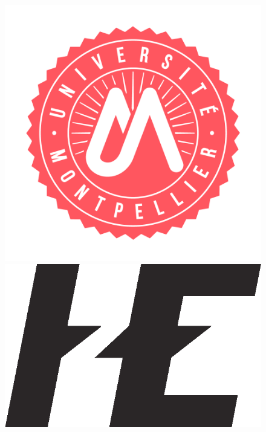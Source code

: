 \documentclass[oneside,11pt,a4paper]{article}
\begin{document}
\begin{titlepage}
	\begin{figure}[h]
		\begin{minipage}[c]{.30\linewidth}
			\centering
			\includegraphics[width=1\textwidth]{img/um.png}
		\end{minipage}
		\hfill
		\begin{minipage}[c]{.30\linewidth}
			\centering
			\includegraphics[width=1\textwidth]{img/HE-noir.png}
		\end{minipage}
		\hfill
		\begin{minipage}[c]{.30\linewidth}
			\centering

\end{minipage}
\end{figure}
\end{titlepage}
\end{document}
